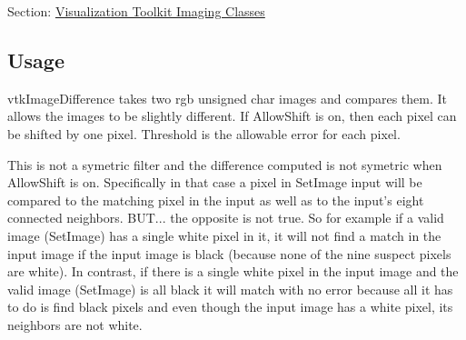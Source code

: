 Section\-: \hyperlink{sec_vtkimaging}{Visualization Toolkit Imaging Classes} \hypertarget{vtkwidgets_vtkxyplotwidget_Usage}{}\subsection{Usage}\label{vtkwidgets_vtkxyplotwidget_Usage}
vtk\-Image\-Difference takes two rgb unsigned char images and compares them. It allows the images to be slightly different. If Allow\-Shift is on, then each pixel can be shifted by one pixel. Threshold is the allowable error for each pixel.

This is not a symetric filter and the difference computed is not symetric when Allow\-Shift is on. Specifically in that case a pixel in Set\-Image input will be compared to the matching pixel in the input as well as to the input's eight connected neighbors. B\-U\-T... the opposite is not true. So for example if a valid image (Set\-Image) has a single white pixel in it, it will not find a match in the input image if the input image is black (because none of the nine suspect pixels are white). In contrast, if there is a single white pixel in the input image and the valid image (Set\-Image) is all black it will match with no error because all it has to do is find black pixels and even though the input image has a white pixel, its neighbors are not white.

